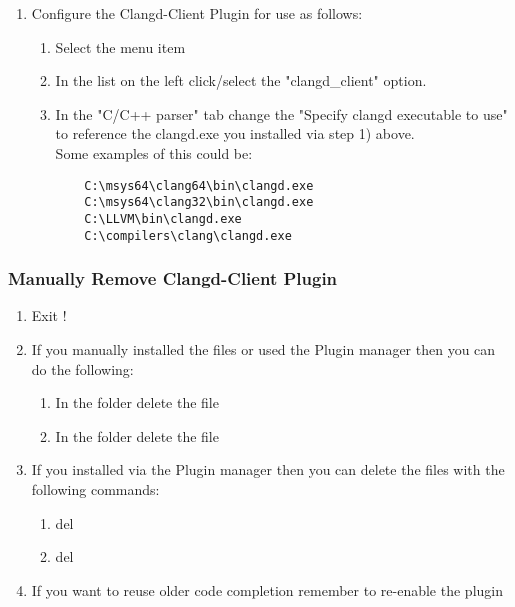 \begin{enumerate}[noitemsep]
\item Configure the Clangd-Client Plugin for use as follows:
    \begin{enumerate}[noitemsep]
    \item Select the \codeblocks menu item 
    \item In the list on the left click/select the "clangd\_client" option.
    \item In the "C/C++ parser" tab change the "Specify clangd executable to use" to reference the clangd.exe you installed via step 1) above. \\ 
    Some examples of this could be:
    \begin{verbatim}
    C:\msys64\clang64\bin\clangd.exe
    C:\msys64\clang32\bin\clangd.exe
    C:\LLVM\bin\clangd.exe
    C:\compilers\clang\clangd.exe
    \end{verbatim}
    \end{enumerate}
\end{enumerate}

\subsubsection{Manually Remove Clangd-Client Plugin}

\begin{enumerate}[noitemsep]
\item Exit \codeblocks !
\item If you manually installed the files or used the Plugin manager then you can do the following: 
    \begin{enumerate}[noitemsep]
    \item In the \codeblocks \textbf{} folder delete the  file
    \item In the \codeblocks \textbf{} folder delete the  file
    \end{enumerate}
\item If you installed via the Plugin manager then you can delete the files with the following commands:
    \begin{enumerate}[noitemsep]
    \item del \textbf{}
    \item del \textbf{}
    \end{enumerate}
\item If you want to reuse older code completion remember to re-enable the plugin
\end{enumerate}

